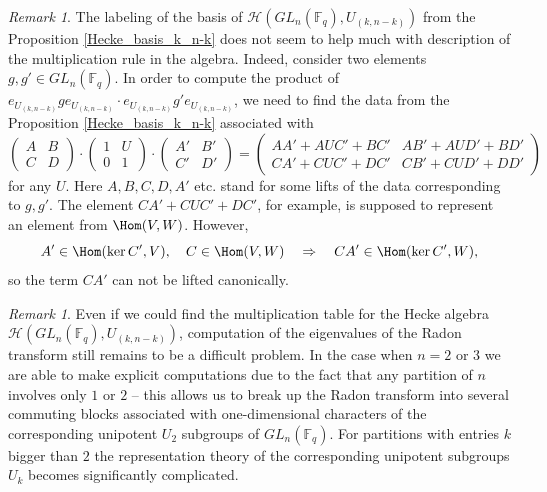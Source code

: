 \documentclass[12pt,reqno]{amsart}
\theoremstyle{definition}
\theoremstyle{remark}
\newtheorem{rem}[thm]{Remark}
\numberwithin{equation}{section}
\newcommand{\GL}[1]{GL_{#1}(\mathbb{F}_q)}
\begin{document}
\begin{rem}\label{Non-canonical_multiplication}
    The labeling of the basis of $\mathcal{H}(\GL{n},U_{(k,n-k)})$ from the Proposition \ref{Hecke_basis_k_n-k} does not seem to help much with description of the multiplication rule in the algebra. Indeed, consider two elements $g,g'\in \GL{n}$. In order to compute the product of $e_{U_{(k,n-k)}}ge_{U_{(k,n-k)}} \cdot e_{U_{(k,n-k)}} g' e_{U_{(k,n-k)}}$, we need to find the data from the Proposition \ref{Hecke_basis_k_n-k} associated with
    \[
    \begin{pmatrix}
    A & B\\
    C & D
    \end{pmatrix}\cdot
    \begin{pmatrix}
        1 & U\\
        0 & 1
    \end{pmatrix}\cdot
    \begin{pmatrix}
    A' & B'\\
    C' & D'
    \end{pmatrix}=
    \begin{pmatrix}
    AA'+AUC'+BC' & AB'+AUD'+BD'\\
    CA'+CUC'+DC' & CB'+CUD'+DD'
    \end{pmatrix}
    \]
    for any $U$. Here $A,B,C,D,A'$ etc. stand for some lifts of the data corresponding to $g,g'$. The element $CA'+CUC'+DC'$, for example, is supposed to represent an element from $\Hom(V,W)$. However,
    \[
    A'\in \Hom(\ker C', V), \quad C\in \Hom(V,W) \quad \Rightarrow  \quad CA'\in \Hom(\ker C',W),
    \]
    so the term $CA'$ can not be lifted canonically.
\end{rem}

\begin{rem}
    Even if we could find the multiplication table for the Hecke algebra \linebreak $\mathcal{H}(\GL{n},U_{(k,n-k)})$, computation of the eigenvalues of the Radon transform still remains to be a difficult problem. In the case when $n=2$ or $3$ we are able to make explicit computations due to the fact that any partition of $n$ involves only $1$ or $2$ -- this allows us to break up the Radon transform into several commuting blocks associated with one-dimensional characters of the corresponding unipotent $U_2$ subgroups of $\GL{n}$. For partitions with entries $k$ bigger than $2$ the representation theory of the corresponding unipotent subgroups $U_k$ becomes significantly complicated. 
\end{rem}
\end{document}
